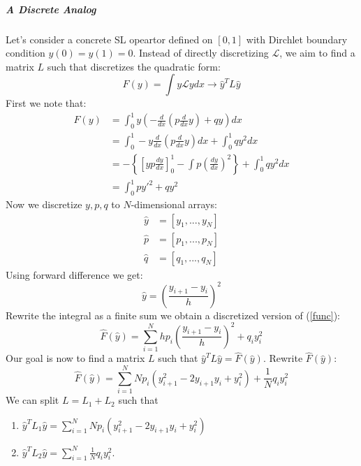 \subparagraph{A Discrete Analog}

Let's consider a concrete SL opeartor defined on $[0,1]$ with Dirchlet boundary condition $y(0)=y(1)=0$. Instead of directly discretizing $\mathcal L$, we aim to find a matrix $L$ such that discretizes the quadratic form:
\begin{equation}
F(y)=\int y\mathcal Ly dx \rightarrow \hat y^TL\hat y
\end{equation}
First we note that:
\begin{equation}
\label{func}
\begin{aligned}
F(y) &= \int_0^1 y\left(-\frac{d}{dx}\left(p\frac{d}{dx}y\right) + qy\right) dx \\
&= \int_0^1 -y \frac{d}{dx}\left(p\frac{d}{dx}y\right)dx+\int_0^1 qy^2dx  \\
&= -\left\{\left[yp\frac{dy}{dx}\right]_0^1 - \int p\left(\frac{dy}{dx}\right)^2 \right\} + \int_0^1 qy^2dx \\
&= \int_0^1 py'^2 + qy^2
\end{aligned}
\end{equation}
Now we discretize $y, p, q$ to $N$-dimensional arrays:
\begin{equation}
\begin{aligned}
\hat y &= [y_1,...,y_N] \\
\hat p &= [p_1,...,p_N] \\
\hat q &= [q_1,...,q_N]
\end{aligned}
\end{equation}
Using forward difference we get:
\begin{equation}
\hat y =\left(\frac{y_{i+1}-y_i}{h}\right)^2
\end{equation}
Rewrite the integral as a finite sum we obtain a discretized version of (\ref{func}):
\begin{equation}
\boxed{\hat F(\hat y)=\sum_{i=1}^N h p_i\left(\frac{y_{i+1}-y_i}{h}\right)^2 +q_iy_i^2}
\end{equation}
Our goal is now to find a matrix $L$ such that $\hat y^TL\hat y=\hat F(\hat y)$. Rewrite $\hat F(\hat y)$:
\begin{equation}
\hat F(\hat y) =\sum_{i=1}^N Np_i(y_{i+1}^2 -2y_{i+1}y_i +y_i^2)+\frac{1}{N}q_iy_i^2
\end{equation}
We can split $L=L_1+L_2$ such that

\begin{enumerate}
\item $\hat y^T L_1 \hat y = \sum_{i=1}^N Np_i(y_{i+1}^2 -2y_{i+1}y_i +y_i^2)$
\item $\hat y^T L_2 \hat y = \sum_{i=1}^N \frac{1}{N}q_iy_i^2$.
\end{enumerate}

